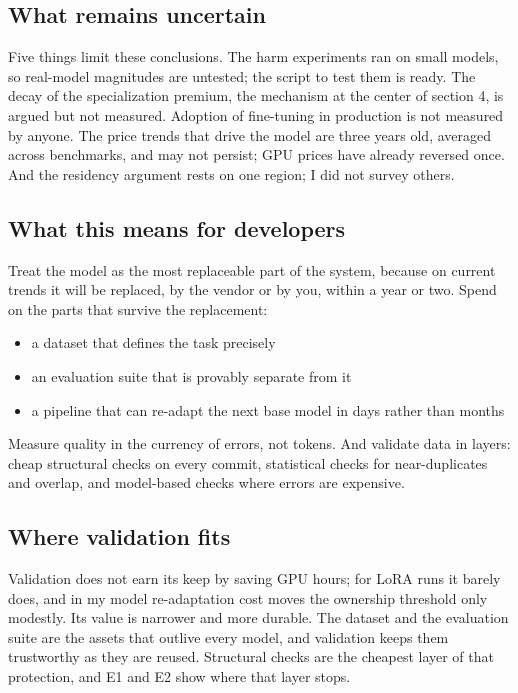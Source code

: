 \subsection{What remains uncertain}

Five things limit these conclusions. The harm experiments ran on small models, so real-model magnitudes are untested; the script to test them is ready. The decay of the specialization premium, the mechanism at the center of section 4, is argued but not measured. Adoption of fine-tuning in production is not measured by anyone. The price trends that drive the model are three years old, averaged across benchmarks, and may not persist; GPU prices have already reversed once. And the residency argument rests on one region; I did not survey others.

\subsection{What this means for developers}

Treat the model as the most replaceable part of the system, because on current trends it will be replaced, by the vendor or by you, within a year or two. Spend on the parts that survive the replacement:

\begin{itemize}
\tightlist
\item
  a dataset that defines the task precisely
\item
  an evaluation suite that is provably separate from it
\item
  a pipeline that can re-adapt the next base model in days rather than months
\end{itemize}

Measure quality in the currency of errors, not tokens. And validate data in layers: cheap structural checks on every commit, statistical checks for near-duplicates and overlap, and model-based checks where errors are expensive.

\subsection{Where validation fits}

Validation does not earn its keep by saving GPU hours; for LoRA runs it barely does, and in my model re-adaptation cost moves the ownership threshold only modestly. Its value is narrower and more durable. The dataset and the evaluation suite are the assets that outlive every model, and validation keeps them trustworthy as they are reused. Structural checks are the cheapest layer of that protection, and E1 and E2 show where that layer stops.

